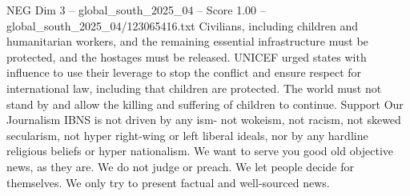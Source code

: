 \begin{textsample}{NEG Dim 3 – global\_south\_2025\_04 – Score 1.00 – global\_south\_2025\_04/123065416.txt}
Civilians, including children and humanitarian workers, and the remaining essential infrastructure must be protected, and the hostages must be released.
UNICEF urged states with influence to use their leverage to stop the conflict and ensure respect for international law, including that children are protected.
The world must not stand by and allow the killing and suffering of children to continue.
Support Our Journalism IBNS is not driven by any ism- not wokeism, not racism, not skewed secularism, not hyper right-wing or left liberal ideals, nor by any hardline religious beliefs or hyper nationalism.
We want to serve you good old objective news, as they are.
We do not judge or preach.
We let people decide for themselves.
We only try to present factual and well-sourced news.

\end{textsample}
